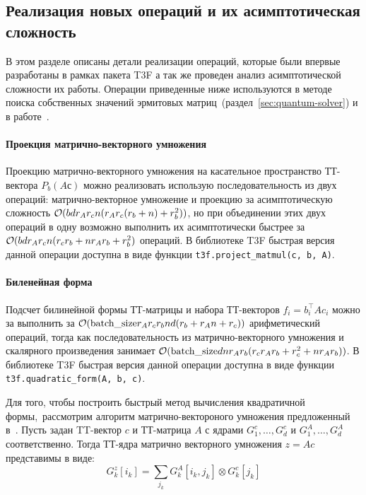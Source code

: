 \subsection{Реализация новых операций и их асимптотическая сложность}
В этом разделе описаны детали реализации операций, которые были впервые разработаны в рамках пакета T3F а так же проведен анализ асимптотической сложности их работы. Операции приведенные ниже используются в методе поиска собственных значений эрмитовых матриц~(раздел~\ref{sec:quantum-solver}) и в работе~\cite{izmailov2018scalable}.


\paragraph{Проекция матрично-векторного умножения}
Проекцию матрично-векторного умножения на касательное пространство ТТ-вектора $P_b(Aс)$ можно реализовать использую последовательность из двух операций: матрично-векторное умножение и проекцию за асимптотическую сложность $\mathcal{O}(b d r_A r_c n (r_A r_c (r_b + n) + r_b^2))$, но при объединении этих двух операций в одну возможно выполнить их асимптотически быстрее за $\mathcal{O}(b d r_A r_c n (r_c r_b + n r_A r_b + r_b^2)$ операций. В библиотеке T3F быстрая версия данной операции доступна в виде функции \texttt{t3f.project\_matmul(c, b, A)}.



\paragraph{Биленейная форма}
Подсчет билинейной формы ТТ-матрицы и набора ТТ-векторов $f_{i} = b_i^\intercal A c_i$ можно за выполнить за $\mathcal{O}(\text{batch\_size} r_A r_c r_b n d (r_b + r_A n + r_c))$ арифметический операций, тогда как последовательность из матрично-векторного умножения и скалярного произведения занимает $\mathcal{O}(\text{batch\_size} d n r_A r_b (r_c r_A r_b + r_c^2 + n r_A r_b))$. В библиотеке T3F быстрая версия данной операции доступна в виде функции \texttt{t3f.quadratic\_form(A, b, c)}.

Для того, чтобы построить быстрый метод вычисления квадратичной формы, рассмотрим алгоритм матрично-вектороного умножения предложенный в~\cite{oseledets2011ttMain}. Пусть задан TT-вектор $c$ и ТТ-матрица $A$ с ядрами $G_1^c, \ldots, G_d^c$ и $G_1^A, \ldots, G_d^A$ соответственно. Тогда ТТ-ядра матрично векторного умножения $z = Ac$ представимы в виде:
\[
G_k^z[i_k] = \sum_{j_k} G_k^A[i_k, j_k] \otimes G_k^c[j_k]
\]

